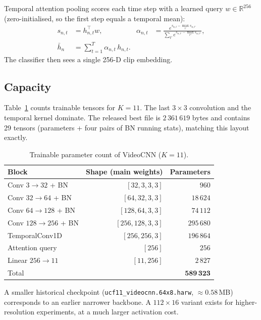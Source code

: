 \documentclass[11pt,a4paper]{article}
\begin{document}
Temporal attention pooling scores each time step with a learned query
$w\in\mathbb{R}^{256}$ (zero-initialised, so the first step equals a
temporal mean):
\begin{align}
  s_{n,t} &= h_{n,t}^{\top} w, &
  \alpha_{n,t} &= \frac{e^{s_{n,t}-\max_{t'}s_{n,t'}}}
                      {\sum_{t'} e^{s_{n,t'}-\max_{t''}s_{n,t''}}},
  \nonumber\\
  \bar h_n &= \sum_{t=1}^{T} \alpha_{n,t}\, h_{n,t}.
  \label{eq:attn}
\end{align}
The classifier then sees a single 256-D clip embedding.

\subsection{Capacity}

Table~\ref{tab:params} counts trainable tensors for $K=11$.
The last $3\times 3$ convolution and the temporal kernel dominate.
The released best file is $2\,361\,619$ bytes and contains 29 tensors
(parameters + four pairs of BN running stats), matching this layout
exactly.

\begin{table}[htbp]
\centering
\caption{Trainable parameter count of VideoCNN ($K=11$).}
\label{tab:params}
\small
\begin{tabular}{@{}lrr@{}}
\toprule
\textbf{Block} & \textbf{Shape (main weights)} & \textbf{Parameters} \\
\midrule
Conv $3\to32$ + BN            & $[32,3,3,3]$     & $960$ \\
Conv $32\to64$ + BN           & $[64,32,3,3]$    & $18\,624$ \\
Conv $64\to128$ + BN          & $[128,64,3,3]$   & $74\,112$ \\
Conv $128\to256$ + BN         & $[256,128,3,3]$  & $295\,680$ \\
TemporalConv1D                & $[256,256,3]$    & $196\,864$ \\
Attention query               & $[256]$          & $256$ \\
Linear $256\to 11$            & $[11,256]$       & $2\,827$ \\
\midrule
Total                         &                  & $\mathbf{589\,323}$ \\
\bottomrule
\end{tabular}
\end{table}

A smaller historical checkpoint
(\texttt{ucf11\_videocnn.64x8.harw}, $\approx 0.58$\,MB) corresponds to an
earlier narrower backbone.
A $112\times 16$ variant exists for higher-resolution experiments, at a
much larger activation cost.
\end{document}
